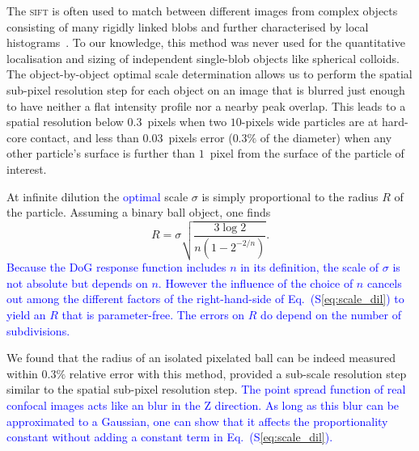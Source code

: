 \documentclass[prl,twocolumn,notitlepage]{revtex4-1}
\begin{document}
The \textsc{sift} is often used to match between different images from complex objects consisting of many rigidly linked blobs and further characterised by local histograms~\citep{Lowe2004}. To our knowledge, this method was never used for the quantitative localisation and sizing of independent single-blob objects like spherical colloids. The object-by-object optimal scale determination allows us to perform the spatial sub-pixel resolution step for each object on an image that is blurred just enough to have neither a flat intensity profile nor a nearby peak overlap. This leads to a spatial resolution below $0.3$~pixels when two $10$-pixels wide particles are at hard-core contact, and less than $0.03$~pixels error ($0.3\%$ of the diameter) when any other particle's surface is further than $1$~pixel from the surface of the particle of interest.

At infinite dilution the \textcolor{blue}{optimal} scale $\sigma$ is simply proportional to the radius $R$ of the particle. Assuming a binary ball object, one finds
\begin{equation}
	R = \sigma \sqrt{\frac{3 \log 2}{n(1-2^{-2/n})}}. 
	\label{eq:scale_dil}
\end{equation}
\textcolor{blue}{Because the DoG response function includes $n$ in its definition, the scale of $\sigma$ is not absolute but depends on $n$. However the influence of the choice of $n$ cancels out among the different factors of the right-hand-side of Eq.~(S\ref{eq:scale_dil}) to yield an $R$ that is parameter-free. The errors on $R$ do depend on the number of subdivisions.}

We found that the radius of an isolated pixelated ball can be indeed measured within $0.3\%$ relative error with this method, provided a sub-scale resolution step similar to the spatial sub-pixel resolution step. \textcolor{blue}{The point spread function of real confocal images acts like an blur in the Z direction. As long as this blur can be approximated to a Gaussian, one can show that it affects the proportionality constant without adding a constant term in Eq.~(S\ref{eq:scale_dil}).}
\end{document}
